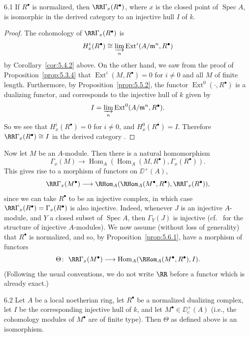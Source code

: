 \begin{bookproposition}{6.1}\label{prop:5.6.1}
If $R^\bullet$ is normalized, then $\RR\Gamma_x(R^\bullet)$, where $x$ is the closed point of $\operatorname{Spec}A$, is isomorphic in the derived category to an injective hull $I$ of $k$.
\end{bookproposition}

\begin{proof}
The cohomology of $\RR\Gamma_x(R^\bullet)$ is
\[
H_{x}^{i}(R^{\bullet})\cong \varinjlim_n\operatorname{Ext}^{i}(A/\mathfrak{m}^{n},R^{\bullet})
\]
by Corollary~\ref{cor:5.4.2} above. On the other hand, we saw from the proof of Proposition~\ref{prop:5.3.4} that $\operatorname{Ext}^{i}(M,R^\bullet)=0$ for $i\neq0$ and all $M$ of finite length. Furthermore, by Proposition~\ref{prop:5.5.2}, the functor $\operatorname{Ext}^{0}(\cdot,R^\bullet)$ is a dualizing functor, and corresponds to the injective hull of $k$ given by
\[
I = \varinjlim_n \operatorname{Ext}^{0}(A/\mathfrak{m}^{n}, R^{\bullet}).
\]
So we see that $H_{x}^{i}(R^\bullet)=0$ for $i\neq0$, and $H_{x}^{0}(R^\bullet)=I$. Therefore $\RR\Gamma_x(R^\bullet)\cong I$ in the derived category .
\end{proof}

Now let $M$ be an $A$-module. Then there is a natural homomorphism
\[
\Gamma_x(M)\longrightarrow \operatorname{Hom}_A(\operatorname{Hom}_A(M,R^{\bullet}), \Gamma_x(R^{\bullet})).
\]
This gives rise to a morphism of functors on $\DD^+(A)$,
\[
\RR\Gamma_x(M^{\bullet})\longrightarrow \RHom_A(\RHom_A(M^{\bullet}, R^{\bullet}), \RR\Gamma_x(R^{\bullet})),
\]
since we can take $R^\bullet$ to be an injective complex, in which case $\RR\Gamma_x(R^\bullet)=\Gamma_x(R^\bullet)$ is also injective. Indeed, whenever $J$ is an injective $A$-module, and $Y$ a closed subset of $\operatorname{Spec}A$, then $\Gamma_Y(J)$ is injective (cf.\  for the structure of injective $A$-modules). We now assume (without loss of generality) that $R^\bullet$ is normalized, and so, by Proposition~\ref{prop:5.6.1}, have a morphism of functors
\[
\Theta\colon\ \RR\Gamma_x(M^{\bullet})\longrightarrow \operatorname{Hom}_A(\RHom_A(M^{\bullet},R^{\bullet}), I).
\]
(Following the usual conventions, we do not write $\RR$ before a functor which is already exact.)

\begin{booktheorem}{6.2}\label{thm:5.6.2}
Let $A$ be a local noetherian ring, let $R^\bullet$ be a normalized dualizing complex, let $I$ be the corresponding injective hull of $k$, and let $M^\bullet\in\DD^+_{\mathrm{c}}(A)$ (i.e., the cohomology modules of $M^\bullet$ are of finite type). Then $\Theta$ as defined above is an isomorphism.
\end{booktheorem}

